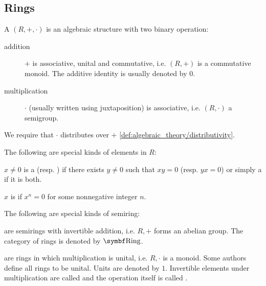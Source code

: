 \subsection{Rings}\label{subsec:rings}

\begin{definition}\label{def:semiring}
  A  \( (R, +, \cdot) \) is an algebraic structure with two binary operation:
  \begin{description}
    \item[addition] \( + \) is associative, unital and commutative, i.e. \( (R, +) \) is a commutative monoid. The additive identity is usually denoted by \( 0 \).

    \item[multiplication] \( \cdot \) (usually written using juxtaposition) is associative, i.e. \( (R, \cdot) \) a semigroup.
  \end{description}

  We require that \( \cdot \) distributes over \( + \) \cref{def:algebraic_theory/distributivity}.

  The following are special kinds of elements in \( R \):
  \begin{defenum}
     \( x \neq 0 \) is a  (resp. ) if there exists \( y \neq 0 \) such that \( xy = 0 \) (resp. \( yx = 0 \)) or simply a  if it is both.

     \( x \) is  if \( x^n = 0 \) for some nonnegative integer \( n \).
  \end{defenum}

  The following are special kinds of semiring:
  \begin{defenum}
      are semirings with invertible addition, i.e. \( R, + \) forms an abelian group. The category of rings is denoted by \( \Cat{Ring} \).

      are rings in which multiplication is unital, i.e. \( R, \cdot \) is a monoid. Some authors define all rings to be unital. Units are denoted by \( 1 \). Invertible elements under multiplication are called  and the operation itself is called .


\end{defenum}
\end{definition}
